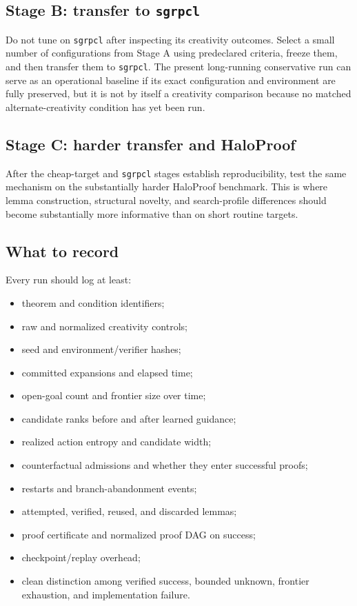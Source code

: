 \documentclass[11pt]{article}
\theoremstyle{datatheorem}
\theoremstyle{definition}
\begin{document}
\subsection{Stage B: transfer to \texttt{sgrpcl}}

Do not tune on \texttt{sgrpcl} after inspecting its creativity outcomes. Select a small number of configurations from Stage A using predeclared criteria, freeze them, and then transfer them to \texttt{sgrpcl}. The present long-running conservative run can serve as an operational baseline if its exact configuration and environment are fully preserved, but it is not by itself a creativity comparison because no matched alternate-creativity condition has yet been run.

\subsection{Stage C: harder transfer and HaloProof}

After the cheap-target and \texttt{sgrpcl} stages establish reproducibility, test the same mechanism on the substantially harder HaloProof benchmark. This is where lemma construction, structural novelty, and search-profile differences should become substantially more informative than on short routine targets.

\subsection{What to record}

Every run should log at least:
\begin{itemize}
\item theorem and condition identifiers;
\item raw and normalized creativity controls;
\item seed and environment/verifier hashes;
\item committed expansions and elapsed time;
\item open-goal count and frontier size over time;
\item candidate ranks before and after learned guidance;
\item realized action entropy and candidate width;
\item counterfactual admissions and whether they enter successful proofs;
\item restarts and branch-abandonment events;
\item attempted, verified, reused, and discarded lemmas;
\item proof certificate and normalized proof DAG on success;
\item checkpoint/replay overhead;
\item clean distinction among verified success, bounded unknown, frontier exhaustion, and implementation failure.
\end{itemize}
\end{document}
